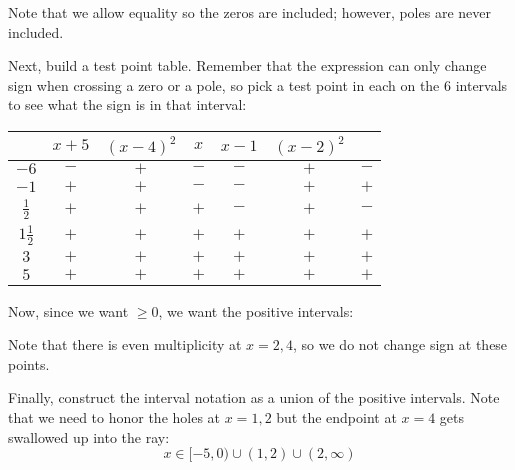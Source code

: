 \documentclass[letterpaper,12pt,fleqn]{article}
\begin{document}
\begin{enumerate}
  Note that we allow equality so the zeros are included; however, poles are
  never included.

  Next, build a test point table. Remember that the expression can only change
  sign when crossing a zero or a pole, so pick a test point in each on the 6
  intervals to see what the sign is in that interval:

  \begin{tabular}{c|ccccc|c}
    & $x+5$ & $(x-4)^2$ & $x$ & $x-1$ & $(x-2)^2$ & \\
    \hline
    $-6$ & $-$ & $+$ & $-$ & $-$ & $+$ & $-$ \\
    $-1$ & $+$ & $+$ & $-$ & $-$ & $+$ & $+$ \\
    $\frac{1}{2}$ & $+$ & $+$ & $+$ & $-$ & $+$ & $-$ \\
    $1\frac{1}{2}$ & $+$ & $+$ & $+$ & $+$ & $+$ & $+$ \\
    $3$ & $+$ & $+$ & $+$ & $+$ & $+$ & $+$ \\
    $5$ & $+$ & $+$ & $+$ & $+$ & $+$ & $+$
  \end{tabular}

  Now, since we want $\ge0$, we want the positive intervals:

  \bigskip


  Note that there is even multiplicity at $x=2,4$, so we do not change sign
  at these points.

  Finally, construct the interval notation as a union of the positive
  intervals. Note that we need to honor the holes at $x=1,2$ but the endpoint
  at $x=4$ gets swallowed up into the ray:
  \[x\in[-5,0)\cup(1,2)\cup(2,\infty)\]


\end{enumerate}
\end{document}
